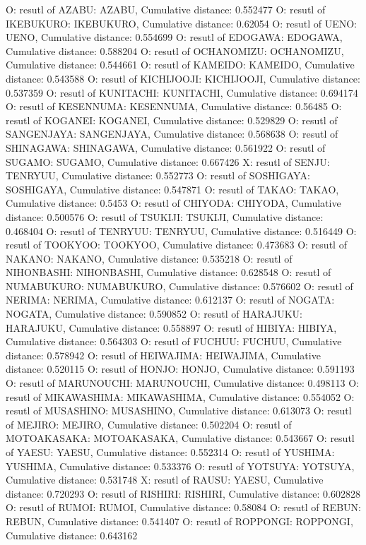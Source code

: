O: resutl of AZABU: AZABU, Cumulative distance: 0.552477
O: resutl of IKEBUKURO: IKEBUKURO, Cumulative distance: 0.62054
O: resutl of UENO: UENO, Cumulative distance: 0.554699
O: resutl of EDOGAWA: EDOGAWA, Cumulative distance: 0.588204
O: resutl of OCHANOMIZU: OCHANOMIZU, Cumulative distance: 0.544661
O: resutl of KAMEIDO: KAMEIDO, Cumulative distance: 0.543588
O: resutl of KICHIJOOJI: KICHIJOOJI, Cumulative distance: 0.537359
O: resutl of KUNITACHI: KUNITACHI, Cumulative distance: 0.694174
O: resutl of KESENNUMA: KESENNUMA, Cumulative distance: 0.56485
O: resutl of KOGANEI: KOGANEI, Cumulative distance: 0.529829
O: resutl of SANGENJAYA: SANGENJAYA, Cumulative distance: 0.568638
O: resutl of SHINAGAWA: SHINAGAWA, Cumulative distance: 0.561922
O: resutl of SUGAMO: SUGAMO, Cumulative distance: 0.667426
X: resutl of SENJU: TENRYUU, Cumulative distance: 0.552773
O: resutl of SOSHIGAYA: SOSHIGAYA, Cumulative distance: 0.547871
O: resutl of TAKAO: TAKAO, Cumulative distance: 0.5453
O: resutl of CHIYODA: CHIYODA, Cumulative distance: 0.500576
O: resutl of TSUKIJI: TSUKIJI, Cumulative distance: 0.468404
O: resutl of TENRYUU: TENRYUU, Cumulative distance: 0.516449
O: resutl of TOOKYOO: TOOKYOO, Cumulative distance: 0.473683
O: resutl of NAKANO: NAKANO, Cumulative distance: 0.535218
O: resutl of NIHONBASHI: NIHONBASHI, Cumulative distance: 0.628548
O: resutl of NUMABUKURO: NUMABUKURO, Cumulative distance: 0.576602
O: resutl of NERIMA: NERIMA, Cumulative distance: 0.612137
O: resutl of NOGATA: NOGATA, Cumulative distance: 0.590852
O: resutl of HARAJUKU: HARAJUKU, Cumulative distance: 0.558897
O: resutl of HIBIYA: HIBIYA, Cumulative distance: 0.564303
O: resutl of FUCHUU: FUCHUU, Cumulative distance: 0.578942
O: resutl of HEIWAJIMA: HEIWAJIMA, Cumulative distance: 0.520115
O: resutl of HONJO: HONJO, Cumulative distance: 0.591193
O: resutl of MARUNOUCHI: MARUNOUCHI, Cumulative distance: 0.498113
O: resutl of MIKAWASHIMA: MIKAWASHIMA, Cumulative distance: 0.554052
O: resutl of MUSASHINO: MUSASHINO, Cumulative distance: 0.613073
O: resutl of MEJIRO: MEJIRO, Cumulative distance: 0.502204
O: resutl of MOTOAKASAKA: MOTOAKASAKA, Cumulative distance: 0.543667
O: resutl of YAESU: YAESU, Cumulative distance: 0.552314
O: resutl of YUSHIMA: YUSHIMA, Cumulative distance: 0.533376
O: resutl of YOTSUYA: YOTSUYA, Cumulative distance: 0.531748
X: resutl of RAUSU: YAESU, Cumulative distance: 0.720293
O: resutl of RISHIRI: RISHIRI, Cumulative distance: 0.602828
O: resutl of RUMOI: RUMOI, Cumulative distance: 0.58084
O: resutl of REBUN: REBUN, Cumulative distance: 0.541407
O: resutl of ROPPONGI: ROPPONGI, Cumulative distance: 0.643162
